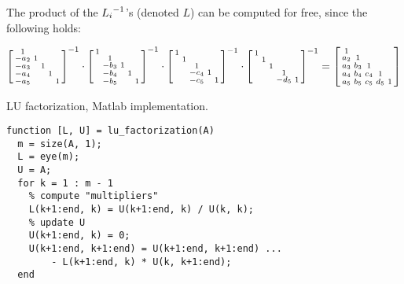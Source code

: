 \documentclass[computational_mathematics.tex]{subfiles}
\begin{document}
\begin{obs}\label{obs:21novstroke1}
  The product of the ${L_i}^{-1}$'s (denoted $L$) can be computed for free, since the following holds:

\begin{gather*}
\begin{bsmallmatrix}
    1 & \\
    -a_2 & 1 & \\
    -a_3 &  & 1  \\
    -a_4 &  & & 1  \\
    -a_5 &  &  & & 1 
\end{bsmallmatrix}^{-1} \cdot
\begin{bsmallmatrix}
    1 & \\
     & 1 & \\
     & -b_3 & 1  \\
     & -b_4 & & 1  \\
     & -b_5 &  & & 1 
\end{bsmallmatrix}^{-1} \cdot
\begin{bsmallmatrix}
    1 & \\
     & 1 & \\
     &  & 1  \\
     &  & -c_4& 1  \\
     &  & -c_5 & & 1 
\end{bsmallmatrix}^{-1} \cdot 
\begin{bsmallmatrix}
    1 & \\
     & 1 & \\
     &  & 1  \\
     &  & & 1  \\
     &  &  & -d_5& 1 
\end{bsmallmatrix}^{-1}
= \begin{bsmallmatrix}
    1 & \\
    a_2 & 1 & \\
    a_3 & b_3 & 1  \\
    a_4 & b_4 & c_4& 1  \\
    a_5 & b_5 & c_5 &d_5 & 1     
\end{bsmallmatrix}
\end{gather*}
\end{obs}

\begin{center}
\begin{minipage}{.9\linewidth}
  \begin{algorithm}[H]
    \caption{LU factorization, Matlab implementation.}\label{algo:21nov1}
    \begin{verbatim}
function [L, U] = lu_factorization(A)
  m = size(A, 1);
  L = eye(m);
  U = A;
  for k = 1 : m - 1
    % compute "multipliers"
    L(k+1:end, k) = U(k+1:end, k) / U(k, k);
    % update U 
    U(k+1:end, k) = 0;
    U(k+1:end, k+1:end) = U(k+1:end, k+1:end) ... 
        - L(k+1:end, k) * U(k, k+1:end);
  end
    \end{verbatim}
  \end{algorithm}
\end{minipage}
\end{center}
\vspace{0.5cm}
\end{document}
